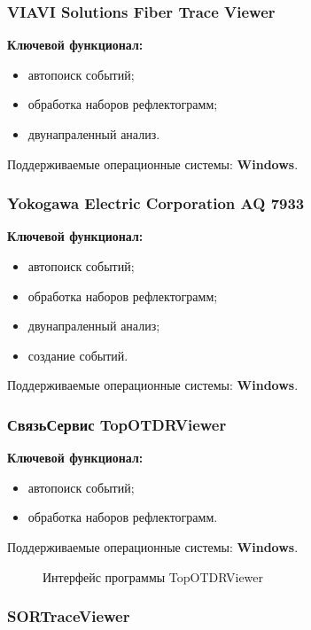 \subsubsection{VIAVI Solutions Fiber Trace Viewer}

\textbf{Ключевой функционал:} \cite{web:viavi}
\begin{itemize}
  \item автопоиск событий;
  \item обработка наборов рефлектограмм;
  \item двунапраленный анализ.
\end{itemize}

Поддерживаемые операционные системы: \textbf{Windows}.

\subsubsection{Yokogawa Electric Corporation AQ 7933}

\textbf{Ключевой функционал:} \cite{web:yokogawa}
\begin{itemize}
  \item автопоиск событий;
  \item обработка наборов рефлектограмм;
  \item двунапраленный анализ;
  \item создание событий.
\end{itemize}

Поддерживаемые операционные системы: \textbf{Windows}.

\subsubsection{СвязьСервис TopOTDRViewer}

\textbf{Ключевой функционал:} \cite{web:topotdrviewer}
\begin{itemize}
  \item автопоиск событий;
  \item обработка наборов рефлектограмм.
\end{itemize}

Поддерживаемые операционные системы: \textbf{Windows}.

\begin{figure}[H]
  \caption{Интерфейс программы TopOTDRViewer}
  \label{ris:topotdrviewer}
\end{figure}

\subsubsection{SORTraceViewer}

